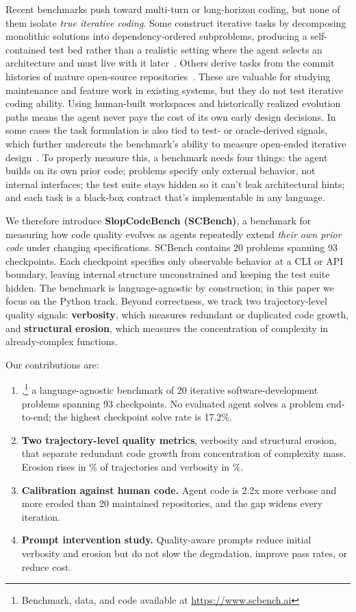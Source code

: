 Recent benchmarks push toward multi-turn or long-horizon coding, but none of them isolate \emph{true iterative coding}. Some construct iterative tasks by decomposing monolithic solutions into dependency-ordered subproblems, producing a self-contained test bed rather than a realistic setting where the agent selects an architecture and must live with it later~\citep{codeflowbench}. Others derive tasks from the commit histories of mature open-source repositories~\citep{thai2025-swe-evo,evoclaw,swe-ci}. These are valuable for studying maintenance and feature work in existing systems, but they do not test iterative coding ability. Using human-built workspaces and historically realized evolution paths means the agent never pays the cost of its own early design decisions. In some cases the task formulation is also tied to test- or oracle-derived signals, which further undercuts the benchmark's ability to measure open-ended iterative design~\citep{swe-ci}. To properly measure this, a benchmark needs four things: the agent builds on its own prior code; problems specify only external behavior, not internal interfaces; the test suite stays hidden so it can't leak architectural hints; and each task is a black-box contract that's implementable in any language.

We therefore introduce \textbf{SlopCodeBench (SCBench)}, a benchmark for measuring how code quality evolves as agents repeatedly extend \emph{their own prior code} under changing specifications. SCBench contains 20 problems spanning 93 checkpoints. Each checkpoint specifies only observable behavior at a CLI or API boundary, leaving internal structure unconstrained and keeping the test suite hidden. The benchmark is language-agnostic by construction; in this paper we focus on the Python track. Beyond correctness, we track two trajectory-level quality signals: \textbf{verbosity}, which measures redundant or duplicated code growth, and \textbf{structural erosion}, which measures the concentration of complexity in already-complex functions.

Our contributions are:
\begin{enumerate}[leftmargin=*,itemsep=2pt,topsep=2pt]
    \item \textbf{\scb{}},\footnote{Benchmark, data, and code available at \url{https://www.scbench.ai}} a language-agnostic benchmark of 20 iterative software-development problems spanning 93 checkpoints. No evaluated agent solves a problem end-to-end; the highest checkpoint solve rate is 17.2\%.
    \item \textbf{Two trajectory-level quality metrics}, verbosity and structural erosion, that separate redundant code growth from concentration of complexity mass. Erosion rises in \erosionPctIncreasing{}\% of trajectories and verbosity in \vfTrajIncPct{}\%.
    \item \textbf{Calibration against human code.} Agent code is 2.2x more verbose and more eroded than 20 maintained repositories, and the gap widens every iteration.
    \item \textbf{Prompt intervention study.} Quality-aware prompts reduce initial verbosity and erosion but do not slow the degradation, improve pass rates, or reduce cost.
\end{enumerate}